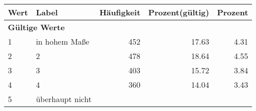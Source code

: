      \begin{longtable}{lXrrr}
     \toprule
     \textbf{Wert} & \textbf{Label} & \textbf{Häufigkeit} & \textbf{Prozent(gültig)} & \textbf{Prozent} \\
     \endhead
     \midrule
     \multicolumn{5}{l}{\textbf{Gültige Werte}}\\

     1 &
     \multicolumn{1}{X}{ in hohem Maße   } &


       \num{452} &
       \num[round-mode=places,round-precision=2]{17.63} &
         \num[round-mode=places,round-precision=2]{4.31} \\

     2 &
     \multicolumn{1}{X}{ 2   } &


       \num{478} &
       \num[round-mode=places,round-precision=2]{18.64} &
         \num[round-mode=places,round-precision=2]{4.55} \\

     3 &
     \multicolumn{1}{X}{ 3   } &


       \num{403} &
       \num[round-mode=places,round-precision=2]{15.72} &
         \num[round-mode=places,round-precision=2]{3.84} \\

     4 &
     \multicolumn{1}{X}{ 4   } &


       \num{360} &
       \num[round-mode=places,round-precision=2]{14.04} &
         \num[round-mode=places,round-precision=2]{3.43} \\

     5 &
     \multicolumn{1}{X}{ überhaupt nicht   } &



\end{longtable}
